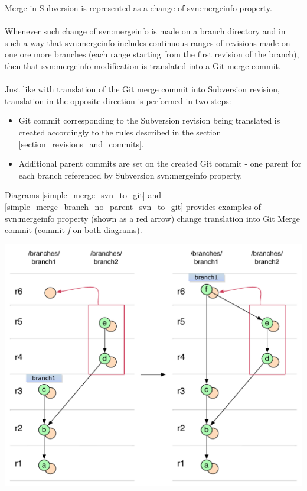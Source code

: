 Merge in Subversion is represented as a change of svn:mergeinfo property.
\\\\
Whenever such change of svn:mergeinfo is made on a branch directory and in 
such a way that svn:mergeinfo includes continuous ranges of revisions
made on one ore more branches (each range starting from the first revision of the branch), 
then that svn:mergeinfo modification is translated into a Git merge commit.
\\\\
Just like with translation of the Git merge commit into Subversion revision, 
translation in the opposite direction is performed in two steps:
\begin{itemize}
\item Git commit corresponding to the Subversion revision being translated is created accordingly 
to the rules described in the section \ref{section_revisions_and_commits}.
\item Additional parent commits are set on the created Git commit - one parent for each branch
referenced by Subversion svn:mergeinfo property.
\end{itemize}
Diagrams \ref{simple_merge_svn_to_git} and \ref{simple_merge_branch_no_parent_svn_to_git} provides
examples of svn:mergeinfo property (shown as a red arrow) change translation into Git Merge commit (commit \emph{f} on both
diagrams).

\begin{center}
\includegraphics[width=\textwidth]{img/diagrams/simple_merge_svn_to_git.pdf}%
\label{simple_merge_svn_to_git}%
\end{center}


